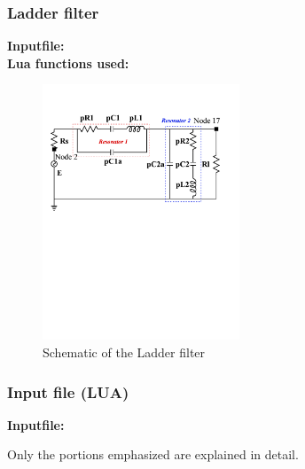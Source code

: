 \clearpage
\subsubsection{Ladder filter}
\begin{flushleft}
  \textbf{Inputfile:}
  \\
  \textbf{Lua functions used:}
\end{flushleft}

\begin{figure}[htbp]
\centering
\includegraphics[trim = 0in 5in 0in 0in, clip, height = 3in]{fig/ladderfilter.pdf}
\caption{Schematic of the Ladder filter}
\label{fig:LadderFilter}
\end{figure}

\clearpage
\subsubsection*{Input file (LUA)}
\begin{flushleft}
  \textbf{Inputfile:}
  \\
\end{flushleft}
\hspace{1in}
{\footnotesize
{}
}

\clearpage
Only the portions emphasized are explained in detail.

